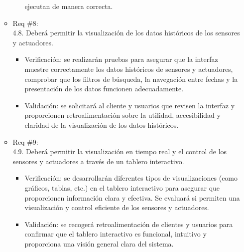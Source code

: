 \begin{itemize}
\begin{itemize}
\begin{itemize}
			                  ejecutan de manera correcta.
		            \end{itemize}
		      \item Req \#8: \\ 4.8. Deberá permitir la visualización de los datos históricos de
		            los sensores y actuadores.
		            \begin{itemize}
			            \item Verificación: se realizarán pruebas para asegurar que la interfaz muestre
			                  correctamente los datos históricos de sensores y actuadores, comprobar que los
			                  filtros de búsqueda, la navegación entre fechas y la presentación de los datos
			                  funcionen adecuadamente.
			            \item Validación: se solicitará al cliente y usuarios que revisen la interfaz
			                  y proporcionen retroalimentación sobre la utilidad, accesibilidad y claridad de
			                  la visualización de los datos históricos.
		            \end{itemize}
		      \item Req \#9: \\ 4.9. Deberá permitir la visualización en tiempo real y el control
		            de los sensores y actuadores a través de un tablero interactivo.
		            \begin{itemize}
			            \item Verificación: se desarrollarán diferentes tipos de visualizaciones (como
			                  gráficos, tablas, etc.) en el tablero interactivo para asegurar que
			                  proporcionen información clara y efectiva. Se evaluará si permiten una
			                  visualización y control eficiente de los sensores y actuadores.
			            \item Validación: se recogerá retroalimentación de clientes y usuarios para
			                  confirmar que el tablero interactivo es funcional, intuitivo y proporciona una
			                  visión general clara del sistema.
		            \end{itemize}
	      \end{itemize}


\end{itemize}
